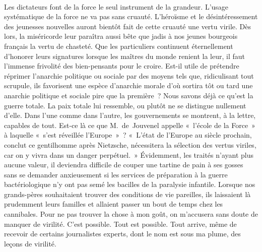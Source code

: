 \documentclass[french,twoside]{book} %
\newcommand{\astertri}{\medskip\par\centerline{\color{rubric}\large\selectfont{\syms ✻\,✻\,✻}}\medskip\par}%
\begin{document}
\astertri

\noindent  \par
Les dictateurs font de la force le seul instrument de la grandeur. L’usage systématique de la force ne va pas sans cruauté. L’héroïsme et le désintéressement des jeunesses nouvelles auront bientôt fait de cette cruauté une vertu virile. Dès lors, la miséricorde leur paraîtra aussi bête que jadis à nos jeunes bourgeois français la vertu de chasteté. Que les particuliers continuent éternellement d’honorer leurs signatures lorsque les maîtres du monde renient la leur, il faut l’immense frivolité des bien-pensants pour le croire. Est-il utile de prétendre réprimer l’anarchie politique ou sociale par des moyens tels que, ridiculisant tout scrupule, ils favorisent une espèce d’anarchie morale d’où sortira tôt ou tard une anarchie politique et sociale pire que la première ? Nous savons déjà ce qu’est la guerre totale. La paix totale lui ressemble, ou plutôt ne se distingue nullement d’elle. Dans l’une comme dans l’autre, les gouvernements se montrent, à la lettre, capables de tout. Est-ce là ce que M. de Jouvenel appelle « l’école de la Force » à laquelle « s’est réveillée l’Europe » ? « L’état de l’Europe au siècle prochain, conclut ce gentilhomme après Nietzsche, nécessitera la sélection des vertus viriles, car on y vivra dans un danger perpétuel. » Évidemment, les traités n’ayant plus aucune valeur, il deviendra difficile de couper une tartine de pain à ses gosses sans se demander anxieusement si les services de préparation à la guerre bactériologique n’y ont pas semé les bacilles de la paralysie infantile. Lorsque nos grands-pères souhaitaient trouver des conditions de vie pareilles, ils laissaient là prudemment leurs familles et allaient passer un bout de temps chez les cannibales. Pour ne pas trouver la chose à mon goût, on m’accusera sans doute de manquer de virilité. C’est possible. Tout est possible. Tout arrive, même de recevoir de certains journalistes experts, dont le nom est sous ma plume, des leçons de virilité.\par
\end{document}
